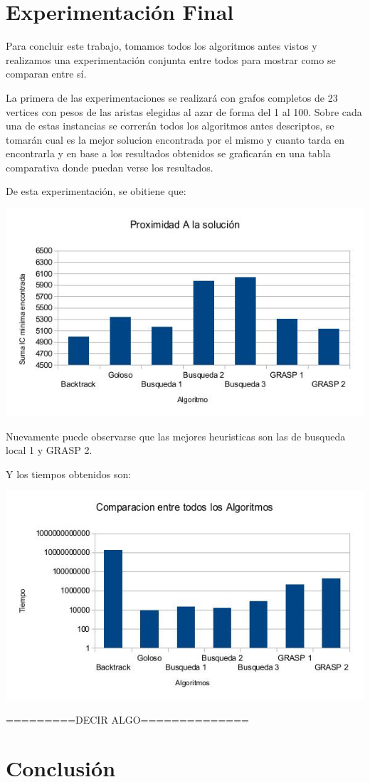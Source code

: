 \section{Experimentación Final}

Para concluir este trabajo, tomamos todos los algoritmos antes vistos y realizamos una experimentación conjunta entre todos para mostrar como se comparan entre sí.

La primera de las experimentaciones se realizará con grafos completos de 23 vertices con pesos de las aristas elegidas al azar de forma  del 1 al 100. Sobre cada una de estas instancias se correrán todos los algoritmos antes descriptos, se tomarán cual es la mejor solucion encontrada por el mismo y cuanto tarda en encontrarla y en base a los resultados obtenidos se graficarán en una tabla comparativa donde puedan verse los resultados.

De esta experimentación, se obitiene que:

\includegraphics[scale=0.5]{Con/result.jpg}

Nuevamente puede observarse que las mejores heuristicas son las de busqueda local 1 y GRASP 2.

Y los tiempos obtenidos son:

\includegraphics[scale=0.5]{Con/tiempos.jpg}

=========DECIR ALGO==============

\section{Conclusión}
